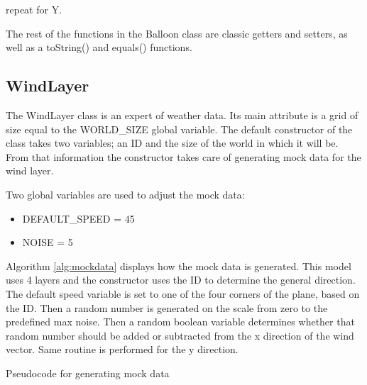 \begin{algorithm}[H]

repeat for Y.\\
\end{algorithm}

The rest of the functions in the Balloon class are classic getters and setters, as well as a toString() and equals() functions.

\subsection{WindLayer}
The WindLayer class is an expert of weather data. Its main attribute is a grid of size equal to the WORLD\_SIZE global variable. The default constructor of the class takes two variables; an ID and the size of the world in which it will be. From that information the constructor takes care of generating mock data for the wind layer.

Two global variables are used to adjust the mock data:
\begin{itemize}
    \item DEFAULT\_SPEED = 45
    \item NOISE = 5
\end{itemize}

Algorithm \ref{alg:mockdata} displays how the mock data is generated. This model uses 4 layers and the constructor uses the ID to determine the general direction. The default speed variable is set to one of the four corners of the plane, based on the ID. Then a random number is generated on the scale from zero to the predefined max noise. Then a random boolean variable determines whether that random number should be added or subtracted from the x direction of the wind vector. Same routine is performed for the y direction. 

\begin{algorithm}[H]

\EndFor
\caption{Pseudocode for generating mock data}
\label{alg:mockdata}
\end{algorithm}


